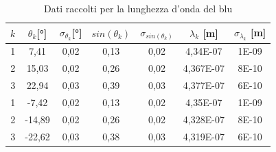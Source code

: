 \documentclass{article}
\begin{document}
        \begin{table}[H]

            \centering

            \begin{tabular}{c c c c c c c}

                \toprule 
                $k$ & $\theta_k$[°] & $\sigma_{\theta_k}$[°] & $sin(\theta_k)$ & $\sigma_{sin(\theta_k)}$ & $\lambda_k$ [m] & $\sigma_{\lambda_k}$ [m] \\
                
                \midrule
                1	&	7,41	&	0,02	&	0,13	&	0,02	&	4,34E-07	&	1E-09\\
                2	&	15,03	&	0,02	&	0,26	&	0,02	&	4,367E-07	&	8E-10\\
                3	&	22,94	&	0,03	&	0,39	&	0,03	&	4,377E-07	&	6E-10\\
                1	&	-7,42	&	0,02	&	0,13	&	0,02	&	4,35E-07	&	1E-09\\
                2	&	-14,89	&	0,02	&	0,26	&	0,02	&	4,328E-07	&	8E-10\\
                3	&	-22,62	&	0,03	&	0,38	&	0,03	&	4,319E-07	&	6E-10\\
                \bottomrule

            \end{tabular}

            \caption{Dati raccolti per la lunghezza d'onda del blu}
            
        \end{table}
        \label{table:blu}
\end{document}
